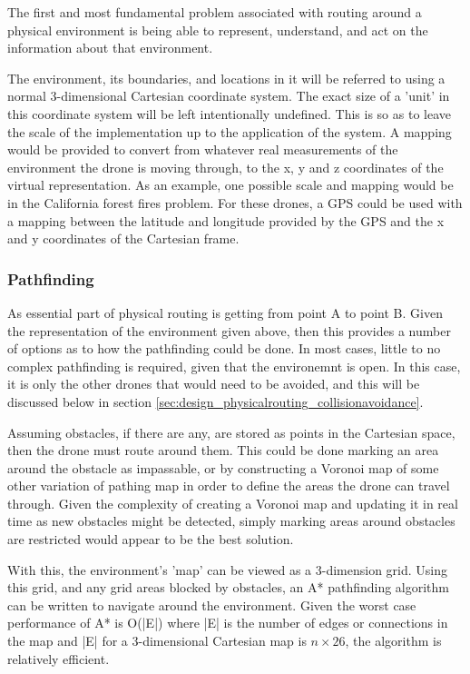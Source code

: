 The first and most fundamental problem associated with routing around a physical environment is being able to represent, understand, and act on the information about that environment.

The environment, its boundaries, and locations in it will be referred to using a normal 3-dimensional Cartesian coordinate system. The exact size of a 'unit' in this coordinate system will be left intentionally undefined. This is so as to leave the scale of the implementation up to the application of the system. A mapping would be provided to convert from whatever real measurements of the environment the drone is moving through, to the x, y and z coordinates of the virtual representation. As an example, one possible scale and mapping would be in the California forest fires problem. For these drones, a GPS could be used with a mapping between the latitude and longitude provided by the GPS and the x and y coordinates of the Cartesian frame.

\subsubsection{Pathfinding}
\label{sec:design_physicalrouting_pathfinding}
		
As essential part of physical routing is getting from point A to point B. Given the representation of the environment given above, then this provides a number of options as to how the pathfinding could be done. In most cases, little to no complex pathfinding is required, given that the environemnt is open. In this case, it is only the other drones that would need to be avoided, and this will be discussed below in section \ref{sec:design_physicalrouting_collisionavoidance}.

Assuming obstacles, if there are any, are stored as points in the Cartesian space, then the drone must route around them. This could be done marking an area around the obstacle as impassable, or by constructing a Voronoi map of some other variation of pathing map in order to define the areas the drone can travel through. Given the complexity of creating a Voronoi map and updating it in real time as new obstacles might be detected, simply marking areas around obstacles are restricted would appear to be the best solution.

With this, the environment's 'map' can be viewed as a 3-dimension grid. Using this grid, and any grid areas blocked by obstacles, an A* pathfinding algorithm can be written to navigate around the environment. Given the worst case performance of A* is O(|E|) where |E| is the number of edges or connections in the map and |E| for a 3-dimensional Cartesian map is $n \times 26$, the algorithm is relatively efficient.

